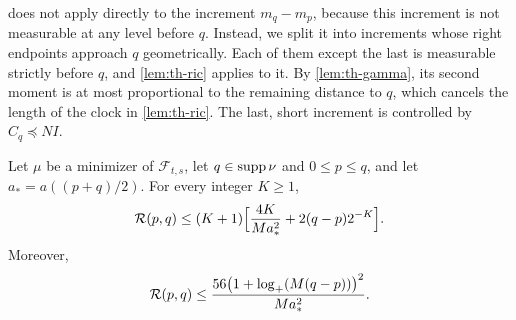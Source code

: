  does not apply directly to the increment $m_q-m_p$,
because this increment is not measurable at any level before $q$.
Instead, we split it into increments whose right endpoints approach $q$
geometrically. Each of them except the last is measurable strictly
before $q$, and \cref{lem:th-ric} applies to it. By \cref{lem:th-gamma},
its second moment is at most proportional to the remaining distance to $q$,
which cancels the length of the clock in \cref{lem:th-ric}. The last,
short increment is controlled by $C_q\preceq NI$.

\begin{lemma}\label{lem:th-res}
Let $\mu$ be a minimizer of $\mathcal F_{t,s}$, let $q\in\operatorname{supp}\nu$ and
$0\le p\le q$, and let $a_*=a((p+q)/2)$. For every integer $K\ge1$,
\begin{equation}\label{eq:th-res-K}
 \mathcal R(p,q)\le(K+1)\Bigl[\frac{4K}{Ma_*^2}+2(q-p)2^{-K}\Bigr].
\end{equation}
Moreover,
\begin{equation}\label{eq:th-res}
 \mathcal R(p,q)\le\frac{56\bigl(1+\log_+(M(q-p))\bigr)^2}{Ma_*^2}.
\end{equation}
\end{lemma}

